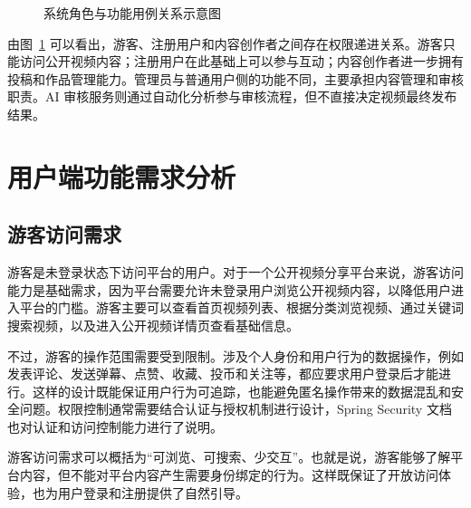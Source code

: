 \begin{figure}[htbp]
  \centering
  \caption{系统角色与功能用例关系示意图}
  \label{fig:system-usecase}
\end{figure}

由图~\ref{fig:system-usecase} 可以看出，游客、注册用户和内容创作者之间存在权限递进关系。游客只能访问公开视频内容；注册用户在此基础上可以参与互动；内容创作者进一步拥有投稿和作品管理能力。管理员与普通用户侧的功能不同，主要承担内容管理和审核职责。AI 审核服务则通过自动化分析参与审核流程，但不直接决定视频最终发布结果。

\section{用户端功能需求分析}
\label{sec:user-side-requirements}

\subsection{游客访问需求}
\label{subsec:visitor-requirements}

游客是未登录状态下访问平台的用户。对于一个公开视频分享平台来说，游客访问能力是基础需求，因为平台需要允许未登录用户浏览公开视频内容，以降低用户进入平台的门槛。游客主要可以查看首页视频列表、根据分类浏览视频、通过关键词搜索视频，以及进入公开视频详情页查看基础信息。

不过，游客的操作范围需要受到限制。涉及个人身份和用户行为的数据操作，例如发表评论、发送弹幕、点赞、收藏、投币和关注等，都应要求用户登录后才能进行。这样的设计既能保证用户行为可追踪，也能避免匿名操作带来的数据混乱和安全问题。权限控制通常需要结合认证与授权机制进行设计，Spring Security 文档也对认证和访问控制能力进行了说明\cite{springsecuritydocs}。

游客访问需求可以概括为“可浏览、可搜索、少交互”。也就是说，游客能够了解平台内容，但不能对平台内容产生需要身份绑定的行为。这样既保证了开放访问体验，也为用户登录和注册提供了自然引导。


